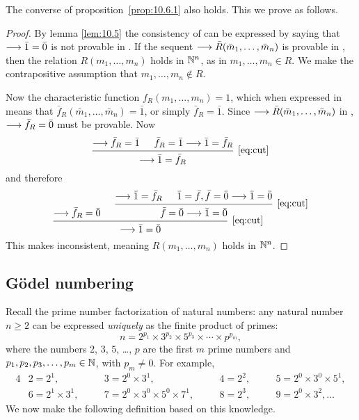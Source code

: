 \documentclass[11pt,a4paper]{article}
\begin{document}
The converse of proposition~\ref{prop:10.6.1} also holds.
This we prove as follows.

\begin{proof}
    By lemma \ref{lem:10.5} the consistency of \PA{}
    can be expressed by saying that \(\longrightarrow\bar1=\bar0\) is not provable in \PA{}.
    If the sequent \(\longrightarrow\bar R(\bar m_1,\ldots,\bar m_n)\)
    is provable in \PA{}, then the relation \(R(m_1,\ldots,m_n)\)
    holds in \(\mathbb{N}^n\), as in \(m_1,\ldots,m_n\in R\).
    We make the contrapositive assumption that \(m_1,\ldots,m_n\notin R\).

    Now the characteristic function \(f_R(m_1,\ldots,m_n) = 1\),
    which when expressed in \PA{} means that
    \(\bar f_R(\bar m_1,\ldots,\bar m_n) = \bar1\),
    or simply \(\bar f_R = \bar1\).
    Since \(\longrightarrow\bar R(\bar m_1,\ldots,\bar m_n)\) in \PA{},
    \(\longrightarrow\bar f_R =\bar0\) must be provable. Now
\begin{equation*}
    \begin{prooftree}
        \hypo{\seq\bar f_R=\bar1}
        \hypo{\bar f_R=\bar1\seq\bar1=\bar f_R}
        \infer2[\eqref{eq:cut}]{\seq\bar1=\bar f_R}
    \end{prooftree}
\end{equation*}
and therefore
\begin{equation*}
    \begin{prooftree}
        \hypo{\seq\bar f_R=\bar0}
        \hypo{\seq\bar1=\bar f_R}
        \hypo{\bar1=\bar f, \bar f=\bar0\seq\bar1=\bar0}
        \infer2[\eqref{eq:cut}]{\bar f=\bar0\seq\bar1=\bar0}
        \infer2[\eqref{eq:cut}]{\seq\bar1=\bar0}
    \end{prooftree}
\end{equation*}
This makes \PA{} inconsistent, meaning \(R(m_1,\ldots,m_n)\) holds in \(\mathbb{N}^n\).
\end{proof}

\subsection{Gödel numbering}

Recall the prime number factorization of natural numbers:
any natural number \(n\geq 2\) can be expressed \emph{uniquely}
as the finite product of primes:
\begin{equation*}
    n = 2^{p_1}\times 3^{p_2}\times 5^{p_3}\times\cdots\times p^{p_m},
\end{equation*}
where the numbers \(2\), \(3\), \(5\), \ldots, \(p\) are the first \(m\)
prime numbers and \(p_1,p_2,p_3,\ldots,p_m \in\mathbb{N}\), with \(p_m\neq 0\).
For example,
\begin{alignat*}{4}
    &2 = 2^1,           &&\quad3 = 2^0\times3^1,                 &&\quad4 = 2^2, &&\quad5 = 2^0\times 3^0\times 5^1, \\
    &6 = 2^1\times 3^1, &&\quad7= 2^0\times3^0\times5^0\times7^1,&&\quad8 = 2^3, &&\quad9 = 2^0\times3^2,\ldots
\end{alignat*}
We now make the following definition based on this knowledge.
\end{document}
